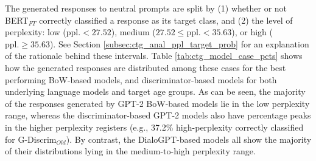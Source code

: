     
    
    
    



The generated responses to neutral prompts are split by (1) whether or not BERT$_{FT}$ correctly classified a response as its target class, and (2) the level of perplexity: low ($\text{ppl.} < 27.52$), medium ($27.52 \leq \text{ppl.} < 35.63$), or high ($\text{ppl.} \geq 35.63$). See Section \ref{subsec:ctg_anal_ppl_target_prob} for an explanation of the rationale behind these intervals. Table \ref{tab:ctg_model_case_pcts} shows how the generated responses are distributed among these cases for the best performing BoW-based models, and discriminator-based models for both underlying language models and target age groups. As can be seen, the majority of the responses generated by GPT-2 BoW-based models lie in the low perplexity range, whereas the discriminator-based GPT-2 models also have percentage peaks in the higher perplexity registers (e.g., 37.2\% high-perplexity correctly classified for G-Discrim$_{Old}$). By contrast, the DialoGPT-based models all show the majority of their distributions lying in the medium-to-high perplexity range.

